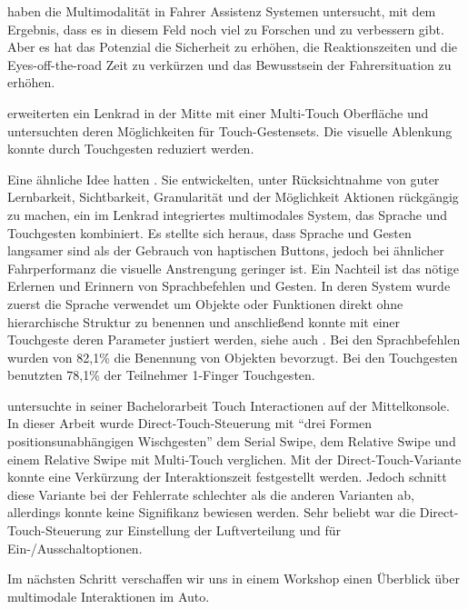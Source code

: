 \citet{Bertoldi:2010} haben die Multimodalität in Fahrer Assistenz Systemen untersucht, mit dem Ergebnis, dass es in diesem Feld noch viel zu Forschen und zu verbessern gibt. 
Aber es hat das Potenzial die Sicherheit zu erhöhen, die Reaktionszeiten und die Eyes-off-the-road Zeit zu verkürzen und das Bewusstsein der Fahrersituation zu erhöhen. 

\citet{Doring:2011} erweiterten ein Lenkrad in der Mitte mit einer Multi-Touch Oberfläche und untersuchten deren Möglichkeiten für Touch-Gestensets. 
Die visuelle Ablenkung konnte durch Touchgesten reduziert werden. 

Eine ähnliche Idee hatten \citet{Pfleging_2012}. 
Sie entwickelten, unter Rücksichtnahme von guter Lernbarkeit, Sichtbarkeit, Granularität und der Möglichkeit Aktionen rückgängig zu machen, ein im Lenkrad integriertes multimodales System, das Sprache und Touchgesten kombiniert. 
Es stellte sich heraus, dass Sprache und Gesten langsamer sind als der Gebrauch von haptischen Buttons, jedoch bei ähnlicher Fahrperformanz die visuelle Anstrengung geringer ist. 
Ein Nachteil ist das nötige Erlernen und Erinnern von Sprachbefehlen und Gesten. 
In deren System wurde zuerst die Sprache verwendet um Objekte oder Funktionen direkt ohne hierarchische Struktur zu benennen und anschließend konnte mit einer Touchgeste deren Parameter justiert werden, siehe auch \citep{Pfleging_t_2011}. 
Bei den Sprachbefehlen wurden von 82,1\% die Benennung von Objekten bevorzugt. 
Bei den Touchgesten benutzten 78,1\% der Teilnehmer 1-Finger Touchgesten. 

\citet{stracke2014touch} untersuchte in seiner Bachelorarbeit Touch Interactionen auf der Mittelkonsole. 
In dieser Arbeit wurde Direct-Touch-Steuerung mit "`drei Formen positionsunabhängigen Wischgesten"' \cite[Seite 57]{stracke2014touch} dem Serial Swipe, dem Relative Swipe und einem Relative Swipe mit Multi-Touch verglichen. 
Mit der Direct-Touch-Variante konnte eine Verkürzung der Interaktionszeit festgestellt werden. 
Jedoch schnitt diese Variante bei der Fehlerrate schlechter als die anderen Varianten ab, allerdings konnte keine Signifikanz bewiesen werden. 
Sehr beliebt war die Direct-Touch-Steuerung zur Einstellung der Luftverteilung und für Ein-/Ausschaltoptionen. 

Im nächsten Schritt verschaffen wir uns in einem Workshop einen Überblick über multimodale Interaktionen im Auto.
